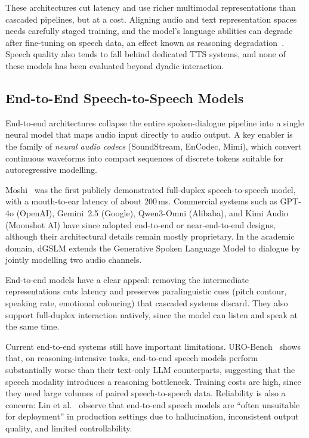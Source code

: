 These architectures cut latency and use richer multimodal representations
than cascaded pipelines, but at a cost. Aligning audio and text
representation spaces needs carefully staged training, and the model's
language abilities can degrade after fine-tuning on speech data, an effect
known as reasoning degradation~\cite{chen2025urobench}. Speech quality
also tends to fall behind dedicated TTS systems, and none of these models
has been evaluated beyond dyadic interaction.

\subsection{End-to-End Speech-to-Speech Models}
\label{subsec:e2e}

End-to-end architectures collapse the entire spoken-dialogue pipeline into
a single neural model that maps audio input directly to audio output. A
key enabler is the family of \emph{neural audio codecs} (SoundStream,
EnCodec, Mimi), which convert continuous waveforms into compact sequences
of discrete tokens suitable for autoregressive modelling.

Moshi~\cite{defossez2024moshi} was the first publicly demonstrated
full-duplex speech-to-speech model, with a mouth-to-ear latency of about
200\,ms. Commercial systems such as GPT-4o (OpenAI), Gemini~2.5 (Google),
Qwen3-Omni (Alibaba), and Kimi Audio (Moonshot AI) have since adopted
end-to-end or near-end-to-end designs, although their architectural
details remain mostly proprietary. In the academic domain, dGSLM extends
the Generative Spoken Language Model to dialogue by jointly modelling two
audio channels.

End-to-end models have a clear appeal: removing the intermediate
representations cuts latency and preserves paralinguistic cues (pitch
contour, speaking rate, emotional colouring) that cascaded systems
discard. They also support full-duplex interaction natively, since the
model can listen and speak at the same time.

Current end-to-end systems still have important limitations.
URO-Bench~\cite{chen2025urobench} shows that, on reasoning-intensive
tasks, end-to-end speech models perform substantially worse than their
text-only LLM counterparts, suggesting that the speech modality introduces
a reasoning bottleneck. Training costs are high, since they need large
volumes of paired speech-to-speech data. Reliability is also a concern:
Lin et al.~\cite{lin2025xtalk} observe that end-to-end speech models are
``often unsuitable for deployment'' in production settings due to
hallucination, inconsistent output quality, and limited controllability.

